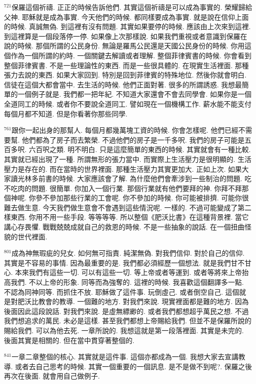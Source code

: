 \documentclass{book}
\begin{document}
$^{721}$保羅這個祈禱.
正正的時候告訴他們.
其實這個祈禱是可以成為事實的.
榮耀歸給父神.
耶穌就是成為事實.
今天他們的時候.
都同樣要成為事實.
就是說在信仰上面的時候.
真誠無偽.
到這裡有沒有問題.
其實如果要停的時候.
應該由上次來到這裡.
到這裡算是一個段落停一停.
如果像上次那樣說.
如果我們重視或者意識到保羅在說的時候.
那個所謂的公民身份.
無論是羅馬公民還是天國公民身份的時候.
你用這個作為一個所謂的約時.
一個關鍵去解讀或者理解.
整個菲律賓書的時候.
你會看到整個菲律賓書.
不是一些理論性的東西.
而是一些很具體的.
在現實生活裡面.
那種張力去說的東西.
如果大家回到.
特別是回到菲律賓的特殊地位.
然後你就會明白.
信徒在這個大都會當中.
去生活的時候.
他們正面對著.
很多的所謂誘惑.
我想最簡單的一個例子就是.
我們都一把年紀.
不知道大家還會不會去同學會.
如果你是一個全道同工的時候.
或者你不要說全道同工.
譬如現在一個機構工作.
薪水能不能支付每個月都不知道.
但是你看著你那些同學.

$^{761}$跟你一起出身的那幫人.
每個月都幾萬塊工資的時候.
你會怎樣呢.
他們已經不需要幫.
他們都為了房子而去繁榮.
不過他們的房子是一千多呎.
我們的房子可能是五百多呎.
六百呎之類.
明不明白.
只是這麼簡單的東西的時候.
其實就會有一種比較.
其實就已經出現了一種.
所謂無形的張力當中.
而實際上生活壓力是很明顯的.
生活壓力是存在的.
而在當時的世界裡面.
那種生活壓力其實更加大.
正如上次.
如果大家讀光林多前書的時候.
大家應該會了解.
為什麼他們會牽涉到一些制治的問題.
吃不吃肉的問題.
很簡單.
你加入一個行業.
那個行業就有他們要拜的神.
你拜不拜那個神呢.
你參不參加那些行業的工會呢.
你不參加的時候.
你可能被排擠.
可能你很難去做生意.
今天我們做生意會不會遇到這些情況呢.
一樣的.
不過可能變成了第二樣東西.
你用不用一些手段.
等等等等.
所以整個《肥沃比書》在這種背景裡.
當它講心存畏懼.
戰戰兢兢成就自己的救恩的時候.
不是一些抽象的說話.
在一個扭曲怪貌的世代裡面.

$^{801}$成為神無瑕疵的兒女.
如何無可指責.
純潔無偽.
對我們信仰.
對於自己的信仰.
其實是不容易的事情.
因為最重要的是.
我們都必須經歷一個想法.
就是我們甘不甘心.
本來我們有這些一切.
可以有這些一切.
等上帝或者等運到.
或者等將來上帝抬高我們.
不以上帝的形象.
同等而為強奪的.
這裡的時候.
我喜歡這個翻譯多一點.
不認為同神同等.
而抓住不放.
耶穌做了這件事.
玩倒虛己.
或者倒空自己.
這個就是對肥沃比教會的教導.
一個難的地方.
對我們來說.
現實裡面都是難的地方.
因為後面因此這段說話.
對我們來說.
是虛無縹緲的.
或者我們都想超乎萬民之想.
不過我們想追求的萬民.
未必是這樣.
甚至我們都想上帝賜給我們.
但並不是保羅所說的賜給我們.
可以為他去死.
一章所說的.
我想這就是第一段落裡面.
其實是未完的.
後面其實是相關的.
但在當中貫穿著整個的.

$^{841}$一章二章整個的核心.
其實就是這件事.
這個亦都成為一個.
我想大家去宣講教導.
或者去自己思考的時候.
其實一個重要的一個訊息.
是不是做不到呢?.
保羅之後再次在後面.
就會用自己做例子.
\newpage
\end{document}
